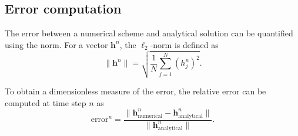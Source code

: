 \subsection{Error computation}
The error between a numerical scheme and analytical solution can be quantified using the norm. For a vector $\mathbf{h}^n$, the $\ell_2$-norm is defined as
\begin{equation}
\|\mathbf{h}^n\| = \sqrt{ \frac{1}{N} \sum_{j=1}^{N} (h_j^n)^2 }.
\end{equation}

To obtain a dimensionless measure of the error, the relative error can be computed at time step $n$ as
\begin{equation}
\text{error}^n = \frac{\|\mathbf{h}_{\text{numerical}}^n - \mathbf{h}_{\text{analytical}}^n\|}{\|\mathbf{h}_{\text{analytical}}^n\|}.
\end{equation}
